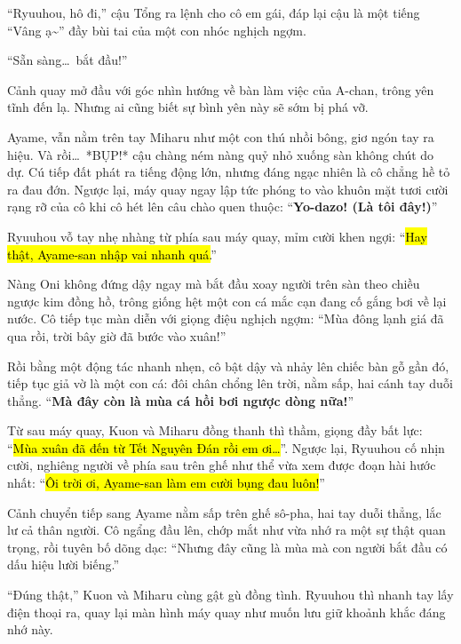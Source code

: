 \documentclass[../main.tex]{subfiles}
\begin{document}
``Ryuuhou, hô đi,'' cậu Tổng ra lệnh cho cô em gái, đáp lại cậu là một tiếng ``Vâng ạ\~{}'' đầy bùi tai của một con nhóc nghịch ngợm.

``Sẵn sàng\dots\ bắt đầu!''

\il

Cảnh quay mở đầu với góc nhìn hướng về bàn làm việc của A-chan, trông yên tĩnh đến lạ. Nhưng ai cũng biết sự bình yên này sẽ sớm bị phá vỡ.

Ayame, vẫn nằm trên tay Miharu như một con thú nhồi bông, giơ ngón tay ra hiệu. Và rồi\dots\ *BỤP!* cậu chàng ném nàng quỷ nhỏ xuống sàn không chút do dự. Cú tiếp đất phát ra tiếng động lớn, nhưng đáng ngạc nhiên là cô chẳng hề tỏ ra đau đớn. Ngược lại, máy quay ngay lập tức phóng to vào khuôn mặt tươi cười rạng rỡ của cô khi cô hét lên câu chào quen thuộc: ``\textbf{Yo-dazo! (Là tôi đây!)}''


Ryuuhou vỗ tay nhẹ nhàng từ phía sau máy quay, mỉm cười khen ngợi: ``\hl{Hay thật, Ayame-san nhập vai nhanh quá.}''

Nàng Oni không đứng dậy ngay mà bắt đầu xoay người trên sàn theo chiều ngược kim đồng hồ, trông giống hệt một con cá mắc cạn đang cố gắng bơi về lại nước. Cô tiếp tục màn diễn với giọng điệu nghịch ngợm: ``Mùa đông lạnh giá đã qua rồi, trời bây giờ đã bước vào xuân!''

Rồi bằng một động tác nhanh nhẹn, cô bật dậy và nhảy lên chiếc bàn gỗ gần đó, tiếp tục giả vờ là một con cá: đôi chân chổng lên trời, nằm sấp, hai cánh tay duỗi thẳng. ``\textbf{Mà đây còn là mùa cá hồi bơi ngược dòng nữa!}''


Từ sau máy quay, Kuon và Miharu đồng thanh thì thầm, giọng đầy bất lực: ``\hl{Mùa xuân đã đến từ Tết Nguyên Đán rồi em ơi\dots}''. Ngược lại, Ryuuhou cố nhịn cười, nghiêng người về phía sau trên ghế như thể vừa xem được đoạn hài hước nhất: ``\hl{Ôi trời ơi, Ayame-san làm em cười bụng đau luôn!}''

Cảnh chuyển tiếp sang Ayame nằm sấp trên ghế sô-pha, hai tay duỗi thẳng, lắc lư cả thân người. Cô ngẩng đầu lên, chớp mắt như vừa nhớ ra một sự thật quan trọng, rồi tuyên bố dõng dạc: ``Nhưng đây cũng là mùa mà con người bắt đầu có dấu hiệu lười biếng.''


``Đúng thật,'' Kuon và Miharu cùng gật gù đồng tình. Ryuuhou thì nhanh tay lấy điện thoại ra, quay lại màn hình máy quay như muốn lưu giữ khoảnh khắc đáng nhớ này.
\end{document}
